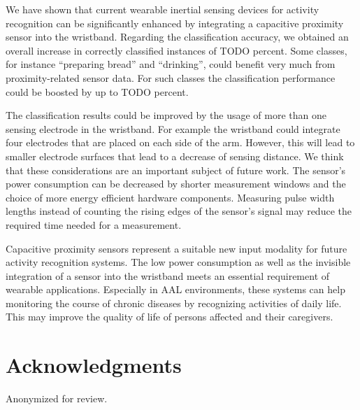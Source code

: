 \documentclass[runningheads,a4paper]{llncs}
\begin{document}
We have shown that current wearable inertial sensing devices for activity recognition can be significantly enhanced by integrating a capacitive proximity sensor into the wristband. Regarding the classification accuracy, we obtained an overall increase in correctly classified instances of TODO percent. Some classes, for instance ``preparing bread'' and ``drinking'', could benefit very much from proximity-related sensor data. For such classes the classification performance could be boosted by up to TODO percent. 

The classification results could be improved by the usage of more than one sensing electrode in the wristband. For example the wristband could integrate four electrodes that are placed on each side of the arm. However, this will lead to smaller electrode surfaces that lead to a decrease of sensing distance. We think that these considerations are an important subject of future work. The sensor's power consumption can be decreased by shorter measurement windows and the choice of more energy efficient hardware components. Measuring pulse width lengths instead of counting the rising edges of the sensor's signal may reduce the required time needed for a measurement.

Capacitive proximity sensors represent a suitable new input modality for future activity recognition systems. The low power consumption as well as the invisible integration of a sensor into the wristband meets an essential requirement of wearable applications. Especially in AAL environments, these systems can help monitoring the course of chronic diseases by recognizing activities of daily life. This may improve the quality of life of persons affected and their caregivers. 

\section*{Acknowledgments}

Anonymized for review.





\end{document}

